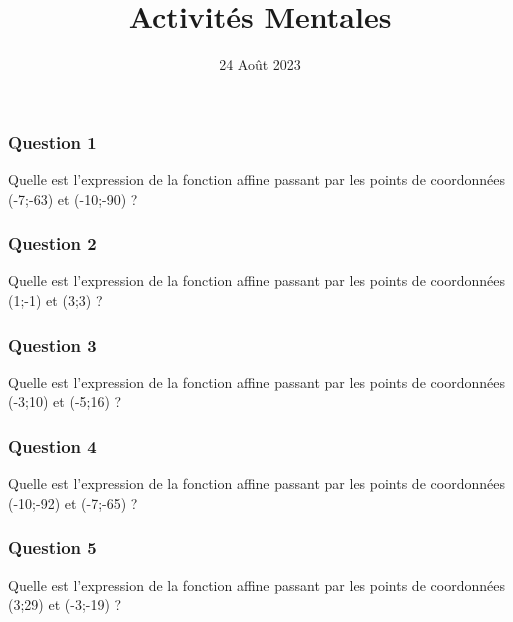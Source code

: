 \documentclass[15pt, mathserif]{beamer}
\title{Activités Mentales}
\date{24 Août 2023}
\begin{document}
\begin{frame}
    \titlepage
\end{frame}

\begin{frame} 
	\frametitle{Question 1}
Quelle est l'expression de la fonction affine passant par les points de coordonnées (-7;-63) et (-10;-90) ?\end{frame}


\begin{frame} 
	\frametitle{Question 2}
Quelle est l'expression de la fonction affine passant par les points de coordonnées (1;-1) et (3;3) ?\end{frame}


\begin{frame} 
	\frametitle{Question 3}
Quelle est l'expression de la fonction affine passant par les points de coordonnées (-3;10) et (-5;16) ?\end{frame}


\begin{frame} 
	\frametitle{Question 4}
Quelle est l'expression de la fonction affine passant par les points de coordonnées (-10;-92) et (-7;-65) ?\end{frame}


\begin{frame} 
	\frametitle{Question 5}
Quelle est l'expression de la fonction affine passant par les points de coordonnées (3;29) et (-3;-19) ?\end{frame}
\end{document}

